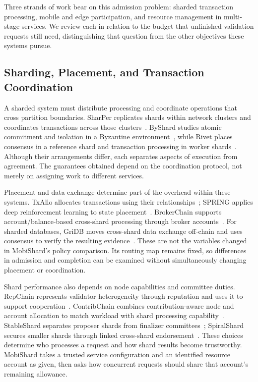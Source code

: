 Three strands of work bear on this admission problem: sharded transaction
processing, mobile and edge participation, and resource management in
multi-stage services. We review each in relation to the budget that unfinished
validation requests still need, distinguishing that question from the other
objectives these systems pursue.

\subsection{Sharding, Placement, and Transaction Coordination}

A sharded system must distribute processing and coordinate operations that
cross partition boundaries. SharPer replicates shards within network clusters
and coordinates transactions across those clusters~\cite{sharper}. ByShard
studies atomic commitment and isolation in a Byzantine
environment~\cite{byshard}, while Rivet places consensus in a reference shard
and transaction processing in worker shards~\cite{rivet}. Although their
arrangements differ, each separates aspects of execution from agreement.
The guarantees obtained depend on the coordination protocol, not merely on
assigning work to different services.

Placement and data exchange determine part of the overhead within these
systems. TxAllo allocates transactions using their relationships~\cite{txallo};
SPRING applies deep reinforcement learning to state placement~\cite{spring}.
BrokerChain supports account/balance-based cross-shard processing through broker
accounts~\cite{brokerchain}. For sharded databases, GriDB moves cross-shard
data exchange off-chain and uses consensus to verify the resulting
evidence~\cite{gridb}. These are not the variables changed in MobiShard's
policy comparison. Its routing map remains fixed, so differences in admission
and completion can be examined without simultaneously changing placement or
coordination.

Shard performance also depends on node capabilities and committee duties.
RepChain represents validator heterogeneity through reputation and uses it to
support cooperation~\cite{repchain}. ContribChain combines contribution-aware
node and account allocation to match workload with shard processing
capability~\cite{contrib}. StableShard separates proposer shards from
finalizer committees~\cite{stableshard}; SpiralShard secures smaller shards through
linked cross-shard endorsement~\cite{spiral}. These choices determine who
processes a request and how shard results become trustworthy. MobiShard takes
a trusted service configuration and an identified resource account as given,
then asks how concurrent requests should share that account's remaining
allowance.

